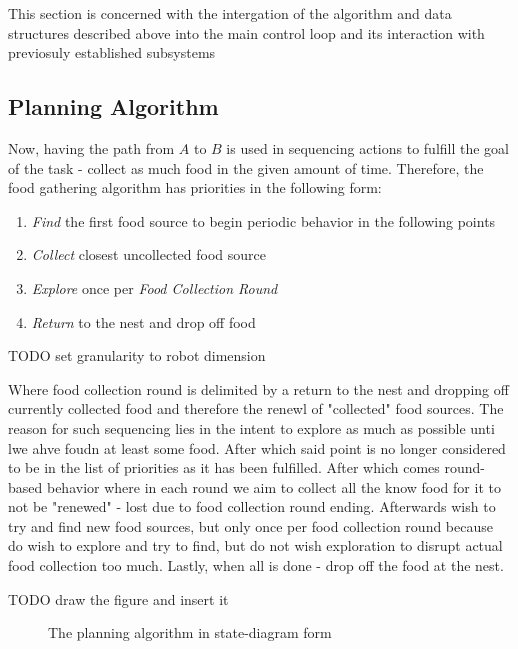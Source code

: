 \documentclass[11pt, a4paper]{article}
\begin{document}
This section is concerned with the intergation of the algorithm and data structures described above into the main control loop and its interaction with previosuly established subsystems\cite{task2_report}

\subsection{Planning Algorithm}

Now, having the path from $A$ to $B$ is used in sequencing actions to fulfill the goal of the task - collect as much food in the given amount of time. Therefore, the food gathering algorithm has priorities in the following form:

\begin{enumerate}
	\item \textit{Find} the first food source to begin periodic behavior in the following points
	\item \textit{Collect} closest uncollected food source
	\item \textit{Explore} once per \textit{Food Collection Round}
	\item \textit{Return} to the nest and drop off food
\end{enumerate}


TODO set granularity to robot dimension

Where food collection round is delimited by a return to the nest and dropping off currently collected food and therefore the renewl of "collected" food sources. The reason for such sequencing lies in the intent to explore as much as possible unti lwe ahve foudn at least some food. After which said point is no longer considered to be in the list of priorities as it has been fulfilled. After which comes round-based behavior where in each round we aim to collect all the know food for it to not be "renewed" - lost due to food collection round ending. Afterwards wish to try and find new food sources, but only once per food collection round  because do wish to explore and try to find, but do not wish exploration to disrupt actual food collection too much. Lastly, when all is done - drop off the food at the nest.

TODO draw the figure and insert it

\begin{figure}
	  \caption{The planning algorithm in state-diagram form}
\end{figure} 
\end{document}

